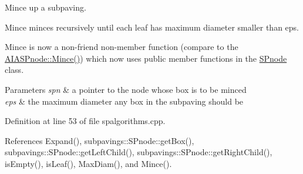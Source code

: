 \-Mince up a subpaving. 

\-Mince minces recursively until each leaf has maximum diameter smaller than eps.

\-Mince is now a non-\/friend non-\/member function (compare to the \hyperlink{classAIASPnode_ab7921c5bd80f01985ee134c5d2ab595d}{\-A\-I\-A\-S\-Pnode\-::\-Mince()}) which now uses public member functions in the \hyperlink{classsubpavings_1_1SPnode}{\-S\-Pnode} class. 
\begin{DoxyParams}{\-Parameters}
{\em spn} & a pointer to the node whose box is to be minced \\
\hline
{\em eps} & the maximum diameter any box in the subpaving should be \\
\hline
\end{DoxyParams}


\-Definition at line 53 of file spalgorithms.\-cpp.



\-References \-Expand(), subpavings\-::\-S\-Pnode\-::get\-Box(), subpavings\-::\-S\-Pnode\-::get\-Left\-Child(), subpavings\-::\-S\-Pnode\-::get\-Right\-Child(), is\-Empty(), is\-Leaf(), \-Max\-Diam(), and \-Mince().


